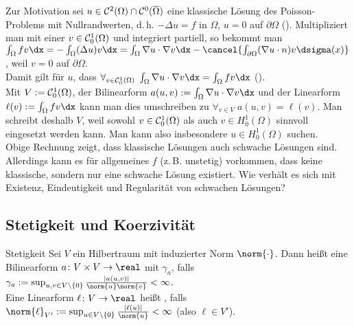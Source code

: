 \begin{Bem}
    Zur Motivation sei $u \in \mathcal{C}^2(\Omega) \cap \mathcal{C}^0(\overline{\Omega})$ eine klassische Lösung
    des Poisson-Problems mit Nullrandwerten, d.\,h.
    $-\Delta u = f$ in $\Omega$, $u = 0$ auf $\partial\Omega$
    ().
    Multipliziert man mit einer  $v \in \mathcal{C}^1_0(\Omega)$ und integriert
    partiell, so bekommt man\\
    $\int_\Omega fv \dx = -\int_\Omega (\Delta u) v \dx
    = \int_\Omega \nabla u \cdot \nabla v \dx -
    \cancel{\int_{\partial\Omega} (\nabla u \cdot n) v \dsigma(x)}$,
    weil $v = 0$ auf $\partial\Omega$.\\
    Damit gilt für $u$, dass
    $\forall_{v \in \C^1_0(\Omega)}\;
    \int_\Omega \nabla u \cdot \nabla v \dx = \int_\Omega fv \dx$
    ().\\
    Mit $V := \mathcal{C}^1_0(\Omega)$,
    der Bilinearform $a(u, v) := \int_\Omega \nabla u \cdot \nabla v \dx$ und der
    Linearform $\ell(v) := \int_\Omega fv \dx$ kann man dies umschreiben zu
    $\forall_{v \in V}\; a(u, v) = \ell(v)$.
    Man schreibt deshalb $V$, weil sowohl $v \in \mathcal{C}^1_0(\Omega)$ als auch
    $v \in H^1_0(\Omega)$ sinnvoll eingesetzt werden kann.
    Man kann also insbesondere  $u \in H^1_0(\Omega)$ suchen.\\
    Obige Rechnung zeigt, dass klassische Lösungen auch schwache Lösungen sind.
    Allerdings kann es für allgemeines $f$ (z.\,B. unstetig) vorkommen, dass keine klassische,
    sondern nur eine schwache Lösung existiert.
    Wie verhält es sich mit Existenz, Eindeutigkeit und Regularität von schwachen Lösungen?
\end{Bem}


\subsection{%
    Stetigkeit und Koerzivität%
}

\begin{Def}{Stetigkeit}
    Sei $V$ ein Hilbertraum mit induzierter Norm $\norm{\cdot}$.
    Dann heißt eine Bilinearform $a\colon V \times V \to \real$  mit
     $\gamma_a$, falls
    $\gamma_a := \sup_{u, v \in V \setminus \{0\}} \frac{|a(u, v)|}{\norm{u} \norm{v}} < \infty$.\\
    Eine Linearform $\ell\colon V \to \real$ heißt , falls
    $\norm{\ell}_{V'} := \sup_{u \in V \setminus \{0\}} \frac{|\ell(u)|}{\norm{u}} < \infty$
    (also $\ell \in V'$).
\end{Def}

